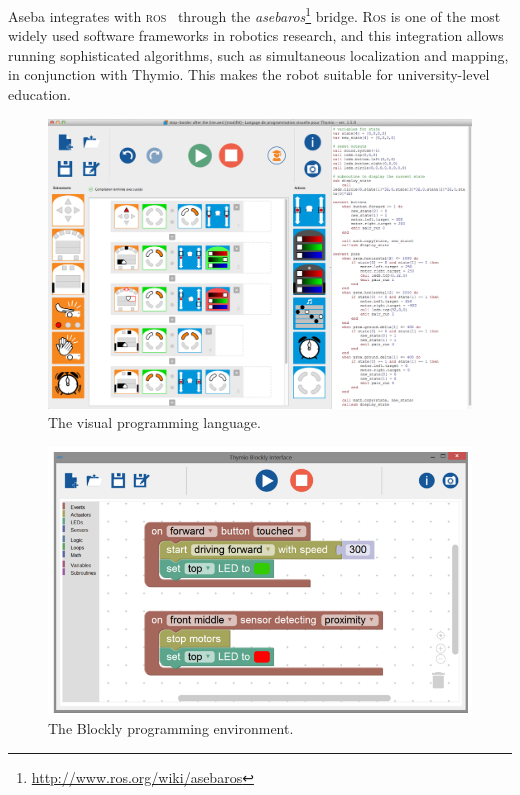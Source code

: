 \documentclass[letterpaper, 10 pt, conference]{ieeeconf}  %
\begin{document}
Aseba integrates with \textsc{ros}~\cite{quigley2009ros} through the \emph{asebaros}\footnote{\url{http://www.ros.org/wiki/asebaros}} bridge.
\textsc{Ros} is one of the most widely used software frameworks in robotics research, and this integration allows running sophisticated algorithms, such as simultaneous localization and mapping, in conjunction with  Thymio.
This makes the robot suitable for university-level education.

\begin{figure}
\centering
\includegraphics[width=\columnwidth]{figures/vpl}
\caption{The visual programming language.}
\label{fig:vpl}
\end{figure}

\begin{figure}
\centering
\includegraphics[width=\columnwidth]{figures/blockly}
\caption{The Blockly programming environment.}
\label{fig:blockly}
\end{figure}
\end{document}
